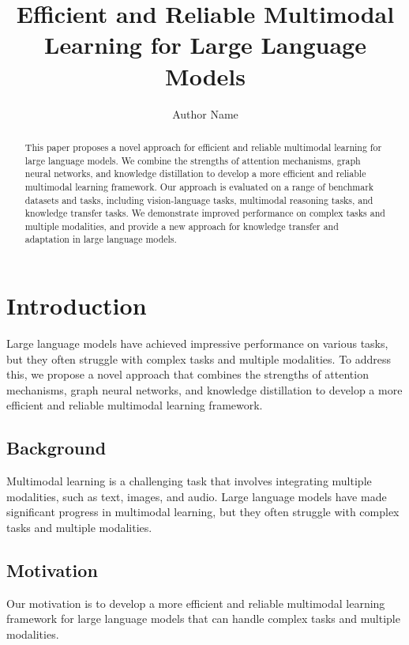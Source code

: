 \documentclass{article}
\begin{document}
\title{Efficient and Reliable Multimodal Learning for Large Language Models}

\author{Author Name}

\maketitle

\begin{abstract}
This paper proposes a novel approach for efficient and reliable multimodal learning for large language models. We combine the strengths of attention mechanisms, graph neural networks, and knowledge distillation to develop a more efficient and reliable multimodal learning framework. Our approach is evaluated on a range of benchmark datasets and tasks, including vision-language tasks, multimodal reasoning tasks, and knowledge transfer tasks. We demonstrate improved performance on complex tasks and multiple modalities, and provide a new approach for knowledge transfer and adaptation in large language models.
\end{abstract}

\section{Introduction}

Large language models have achieved impressive performance on various tasks, but they often struggle with complex tasks and multiple modalities. To address this, we propose a novel approach that combines the strengths of attention mechanisms, graph neural networks, and knowledge distillation to develop a more efficient and reliable multimodal learning framework.

\subsection{Background}

Multimodal learning is a challenging task that involves integrating multiple modalities, such as text, images, and audio. Large language models have made significant progress in multimodal learning, but they often struggle with complex tasks and multiple modalities.

\subsection{Motivation}

Our motivation is to develop a more efficient and reliable multimodal learning framework for large language models that can handle complex tasks and multiple modalities.
\end{document}

